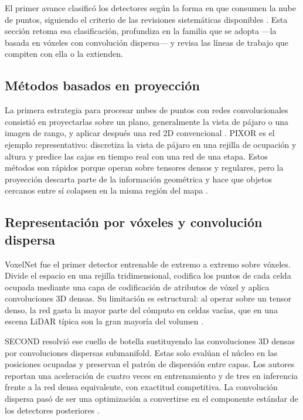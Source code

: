 \documentclass[11pt,letterpaper]{article}
\begin{document}
El primer avance clasificó los detectores según la forma en que consumen la nube de puntos, siguiendo el criterio de las revisiones sistemáticas disponibles \cite{qian2022, zamanakos2021, cai2025}. Esta sección retoma esa clasificación, profundiza en la familia que se adopta ---la basada en vóxeles con convolución dispersa--- y revisa las líneas de trabajo que compiten con ella o la extienden.

\subsection{Métodos basados en proyección}
\label{sec:proyeccion}

La primera estrategia para procesar nubes de puntos con redes convolucionales consistió en proyectarlas sobre un plano, generalmente la vista de pájaro o una imagen de rango, y aplicar después una red 2D convencional \cite{qian2022, zamanakos2021}. PIXOR \cite{yang2018} es el ejemplo representativo: discretiza la vista de pájaro en una rejilla de ocupación y altura y predice las cajas en tiempo real con una red de una etapa. Estos métodos son rápidos porque operan sobre tensores densos y regulares, pero la proyección descarta parte de la información geométrica y hace que objetos cercanos entre sí colapsen en la misma región del mapa \cite{cai2025}.

\subsection{Representación por vóxeles y convolución dispersa}
\label{sec:voxeles}

VoxelNet \cite{zhou2018} fue el primer detector entrenable de extremo a extremo sobre vóxeles. Divide el espacio en una rejilla tridimensional, codifica los puntos de cada celda ocupada mediante una capa de codificación de atributos de vóxel y aplica convoluciones 3D densas. Su limitación es estructural: al operar sobre un tensor denso, la red gasta la mayor parte del cómputo en celdas vacías, que en una escena LiDAR típica son la gran mayoría del volumen \cite{zamanakos2021}.

SECOND \cite{yan2018} resolvió ese cuello de botella sustituyendo las convoluciones 3D densas por convoluciones dispersas submanifold. Estas solo evalúan el núcleo en las posiciones ocupadas y preservan el patrón de dispersión entre capas. Los autores reportan una aceleración de cuatro veces en entrenamiento y de tres en inferencia frente a la red densa equivalente, con exactitud competitiva. La convolución dispersa pasó de ser una optimización a convertirse en el componente estándar de los detectores posteriores \cite{ke2025, ao2026}.
\end{document}
